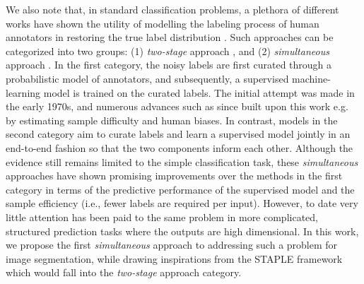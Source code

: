 We also note that, in standard classification problems, a plethora of different works have shown the utility of modelling the labeling process of human annotators in restoring the true label distribution \cite{raykar2010learning,khetan2017learning,tanno2019learning}. Such approaches can be categorized into two groups: (1) \textit{two-stage} approach \cite{dawid1979maximum,smyth1995inferring,whitehill2009whose,welinder2010multidimensional,rodrigues2013learning}, and (2) \textit{simultaneous} approach \cite{raykar2009supervised,yan2010modeling,branson2017lean,van2018lean,khetan2017learning,tanno2019learning,sudre2019let}. In the first category, the noisy labels are first curated through a probabilistic model of annotators, and subsequently, a supervised machine-learning model is trained on the curated labels. The initial attempt \cite{dawid1979maximum} was made in the early 1970s, and numerous advances such as \cite{smyth1995inferring,whitehill2009whose,welinder2010multidimensional,rodrigues2013learning} since built upon this work e.g. by estimating sample difficulty and human biases. In contrast, models in the second category aim to curate labels and learn a supervised model jointly in an end-to-end fashion \cite{raykar2009supervised,yan2010modeling,branson2017lean,van2018lean,khetan2017learning,tanno2019learning} so that the two components inform each other. Although the evidence still remains limited to the simple classification task, these \textit{simultaneous} approaches have shown promising improvements over the methods in the first category in terms of the predictive performance of the supervised model and the sample efficiency (i.e., fewer labels are required per input). However, to date very little attention has been paid to the same problem in more complicated, structured prediction tasks where the outputs are high dimensional. In this work, we propose the first \textit{simultaneous} approach to addressing such a problem for image segmentation, while drawing inspirations from the STAPLE framework \cite{warfield2004simultaneous} which would fall into the \textit{two-stage} approach category. 

